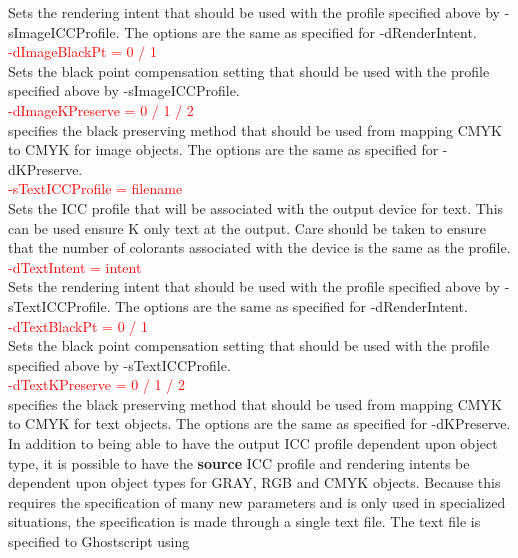\documentclass[12pt,notitlepage]{article}
\begin{document}
\noindent Sets the rendering intent that should be used with the profile specified above by -sImageICCProfile. The options are the same as specified for -dRenderIntent. \\

\textcolor{red}{-dImageBlackPt = 0 / 1}\\

\noindent Sets the black point compensation setting that should be used with the profile specified above by -sImageICCProfile.\\

\textcolor{red}{-dImageKPreserve = 0 / 1 / 2}\\

\noindent specifies the black preserving method that should be used from mapping CMYK to CMYK for image objects.   The
options are the same as specified for -dKPreserve.\\

\textcolor{red}{-sTextICCProfile = filename}\\

\noindent Sets the ICC profile that will be associated with the output device for text.  This can be used ensure K only text at the output. Care should be taken to ensure that the number of colorants associated with the device is the same as the profile.\\

\textcolor{red}{-dTextIntent = intent}\\

\noindent Sets the rendering intent that should be used with the profile specified above by -sTextICCProfile. The options are the same as specified for -dRenderIntent. \\

\textcolor{red}{-dTextBlackPt = 0 / 1}\\

\noindent Sets the black point compensation setting that should be used with the profile specified above by -sTextICCProfile.\\

\textcolor{red}{-dTextKPreserve = 0 / 1 / 2}\\

\noindent specifies the black preserving method that should be used from mapping CMYK to CMYK for text objects.   The
options are the same as specified for -dKPreserve.\\

In addition to being able to have the output ICC profile dependent upon object type, it is possible to have the {\bf source} ICC profile and rendering intents be dependent upon object types for GRAY, RGB and CMYK objects.  Because this requires the specification of many new parameters and is only used in specialized situations, the specification is made through a single text file.  The text file is specified to Ghostscript using\\
\end{document}
